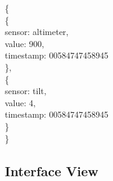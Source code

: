 \documentclass[10pt,draftclsnofoot,onecolumn]{IEEEtran}
\begin{document}
{\noindent\{\\
\hspace*{.5cm}\{\\
\hspace*{1cm}sensor: altimeter,\\
\hspace*{1cm}value: 900,\\
\hspace*{1cm}timestamp: 00584747458945\\
\hspace*{.5cm}\},\\
\hspace*{.5cm}\{\\
\hspace*{1cm}sensor: tilt,\\
\hspace*{1cm}value: 4,\\
\hspace*{1cm}timestamp: 00584747458945\\
\hspace*{.5cm}\}\\
\}
}

	\subsection{Interface View}
	
\end{document}
